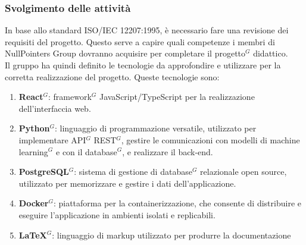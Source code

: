 \subsubsection{Svolgimento delle attività}
In base allo standard ISO/IEC 12207:1995, è necessario fare una revisione dei requisiti del progetto. Questo serve a capire quali competenze i membri di NullPointers Group dovranno acquisire per completare il progetto$^G$ didattico.\\
Il gruppo ha quindi definito le tecnologie da approfondire e utilizzare per la corretta realizzazione del progetto.
Queste tecnologie sono:
\begin{enumerate}
    \item \textbf{React$^G$}: framework$^G$ JavaScript/TypeScript per la realizzazione dell'interfaccia web.
    \item \textbf{Python$^G$}: linguaggio di programmazione versatile, utilizzato per implementare API$^G$ REST$^G$, gestire le comunicazioni con modelli di machine learning$^G$ e con il database$^G$, e realizzare il back-end.
    \item \textbf{PostgreSQL$^G$}: sistema di gestione di database$^G$ relazionale open source, utilizzato per memorizzare e gestire i dati dell’applicazione.
    \item \textbf{Docker$^G$}: piattaforma per la containerizzazione, che consente di distribuire e eseguire l’applicazione in ambienti isolati e replicabili.
    \item \textbf{LaTeX$^G$}: linguaggio di markup utilizzato per produrre la documentazione
\end{enumerate}